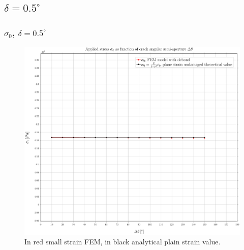 \documentclass[first,firstsupp,lastsupp,handout,last,hyperref,table]{ETHclass}
\begin{document}

\subsection{$\delta=0.5^{\circ}$}

\begin{frame}
\frametitle{\small $\sigma_{0}$, $\delta=0.5^{\circ}$}
\vspace{-0.5cm}
\centering
\captionsetup[figure]{font=scriptsize,labelfont=scriptsize}
\begin{figure}[!h]
\centering
\includegraphics[height=0.7\textheight]{2017-07-10_AbqRunSummary_SmallStrainD05_sigma-inf_Summary.pdf}
  \caption{\scriptsize In red small strain FEM, in black analytical plain strain value.}
  \label{fig:res1}
\end{figure}
\end{frame}
\end{document}
